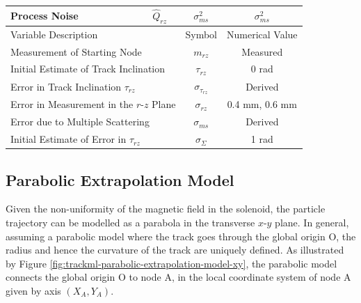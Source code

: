 \begin{table}[H]
\begin{center}
\begin{tabular}{lccc}
Process Noise
& $\hat{Q}_{rz}$ 
& $\sigma_{ms}^2$
& $\sigma_{ms}^2$
\\  

\bottomrule

\multicolumn{2}{l}{Variable Description} 
& Symbol & Numerical Value  \\
\hline

\multicolumn{2}{l}{Measurement of Starting Node} 
& $m_{rz}$ & Measured \\

\multicolumn{2}{l}{Initial Estimate of Track Inclination} 
& $\tau_{rz}$ & 0 rad \\

\multicolumn{2}{l}{Error in Track Inclination $\tau_{rz}$} 
& $\sigma_{\tau_{rz}}$ & Derived \\

\multicolumn{2}{l}{Error in Measurement in the $r$-$z$ Plane} 
& $\sigma_{rz}$ & 0.4 mm, 0.6 mm  \\

\multicolumn{2}{l}{Error due to Multiple Scattering} 
& $\sigma_{ms}$ & Derived \\

\multicolumn{2}{l}{Initial Estimate of Error in $\tau_{rz}$} 
& $\sigma_{\Sigma}$ & 1 rad \\

              

\bottomrule

\end{tabular}
\end{center}
\label{tab:kf-instance-variables-rz}
\end{table}








\subsection{Parabolic Extrapolation Model}
\label{chapter-6-start-of-derivation}



Given the non-uniformity of the magnetic field in the solenoid, the particle trajectory can be modelled as a parabola in the transverse $x$-$y$ plane. In general, assuming a parabolic model where the track goes through the global origin O, the radius and hence the curvature of the track are uniquely defined. As illustrated by Figure \ref{fig:trackml-parabolic-extrapolation-model-xy}, the parabolic model connects the global origin O to node A, in the local coordinate system of node A given by axis $(X_A, Y_A)$.


